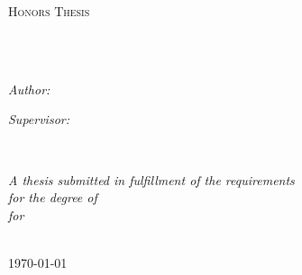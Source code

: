 \documentclass[
11pt, %
english, %
singlespacing, %
headsepline, %
]{MastersDoctoralThesis} %
\author{Dylan \textsc{Lathrum}} %
\begin{document}
\frontmatter %

\pagestyle{plain} %


\begin{titlepage}
	\begin{center}

		\vspace*{.06\textheight}
		{\scshape\LARGE \univname\par}\vspace{1.5cm} %
		\textsc{\Large Honors Thesis}\\[0.5cm] %

		\HRule \\[0.4cm] %
		{\huge \bfseries \ttitle\par}\vspace{0.4cm} %
		\HRule \\[1.5cm] %

		\begin{minipage}[t]{0.4\textwidth}
			\begin{flushleft} \large
				\emph{Author:}\\
				\href{https://www.linkedin.com/in/dylanlathrum/}{\authorname} %
			\end{flushleft}
		\end{minipage}
		\begin{minipage}[t]{0.4\textwidth}
			\begin{flushright} \large
				\emph{Supervisor:} \\
				\href{https://isearch.asu.edu/profile/3180015}{\supname} %
			\end{flushright}
		\end{minipage}\\[3cm]

		\vfill

		\large \textit{A thesis submitted in fulfillment of the requirements\\ for the degree of \degreename}\\[0.3cm] %
		\textit{for}\\[0.4cm]
		\deptname\\[2cm] %

		\vfill

		{\large \today}\\[4cm] %

		\vfill
	\end{center}
\end{titlepage}
\end{document}
